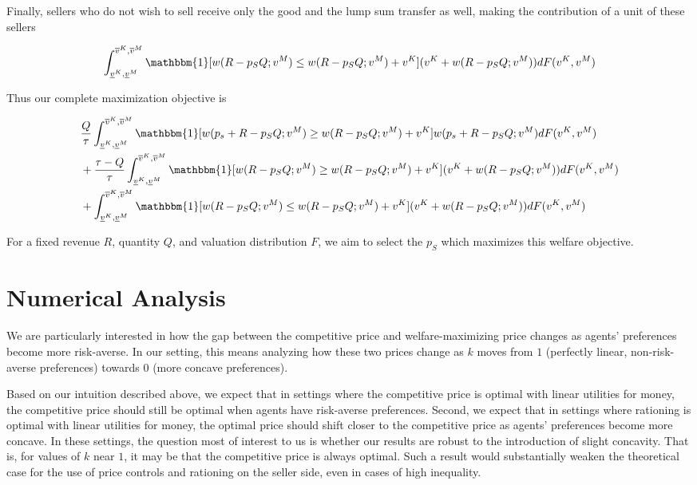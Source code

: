 \documentclass[AER]{AEA}
\begin{document}
Finally, sellers who do not wish to sell receive only the good and the lump sum transfer as well, making the contribution of a unit of these sellers

\begin{equation}
    \int_{\underline{v}^K, \underline{v}^M}^{\overline{v}^K, \overline{v}^M} \mathbbm{1}[w(R - p_SQ; v^M) \le w(R - p_S Q ; v^M) + v^K] (v^K + w(R - p_SQ; v^M)) dF(v^K, v^M)
\end{equation}

Thus our complete maximization objective is

\begin{equation}
    \begin{split}
        & \frac{Q}{\tau} \int_{\underline{v}^K, \underline{v}^M}^{\overline{v}^K, \overline{v}^M} \mathbbm{1}[w(p_s + R - p_SQ; v^M) \ge w(R - p_S Q ; v^M) + v^K] w(p_s + R - p_SQ; v^M) dF(v^K, v^M) \\
        & + \frac{\tau - Q}{\tau} \int_{\underline{v}^K, \underline{v}^M}^{\overline{v}^K, \overline{v}^M} \mathbbm{1}[w(R - p_SQ; v^M) \ge w(R - p_S Q ; v^M) + v^K] (v^K + w(R - p_SQ; v^M)) dF(v^K, v^M) \\
        & + \int_{\underline{v}^K, \underline{v}^M}^{\overline{v}^K, \overline{v}^M} \mathbbm{1}[w(R - p_SQ; v^M) \le w(R - p_S Q ; v^M) + v^K] (v^K + w(R - p_SQ; v^M)) dF(v^K, v^M)
    \end{split}
\end{equation}

For a fixed revenue $R$, quantity $Q$, and valuation distribution $F$, we aim to select the $p_S$ which maximizes this welfare objective.

\section{Numerical Analysis}

We are particularly interested in how the gap between the competitive price and welfare-maximizing price changes as agents' preferences become more risk-averse. In our setting, this means analyzing how these two prices change as $k$ moves from $1$ (perfectly linear, non-risk-averse preferences) towards $0$ (more concave preferences).

Based on our intuition described above, we expect that in settings where the competitive price is optimal with linear utilities for money, the competitive price should still be optimal when agents have risk-averse preferences. Second, we expect that in settings where rationing is optimal with linear utilities for money, the optimal price should shift closer to the competitive price as agents' preferences become more concave. In these settings, the question most of interest to us is whether our results are robust to the introduction of slight concavity. That is, for values of $k$ near $1$, it may be that the competitive price is always optimal. Such a result would substantially weaken the theoretical case for the use of price controls and rationing on the seller side, even in cases of high inequality.
\end{document}
